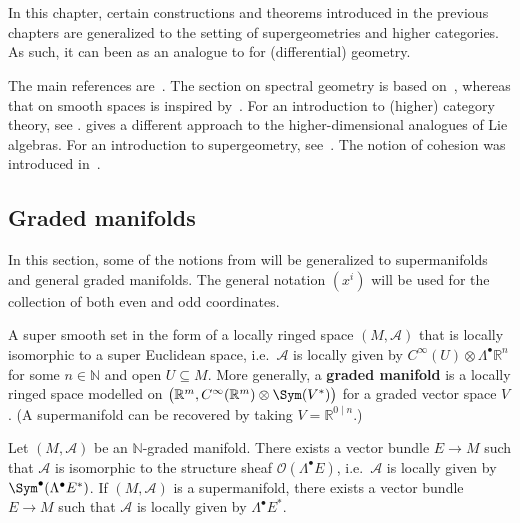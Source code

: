 \chapter{}\label{chapter:hdg}

    In this chapter, certain constructions and theorems introduced in the previous chapters are generalized to the setting of supergeometries and higher categories. As such, it can been as an analogue to  for (differential) geometry.

    The main references are~\citet{schreiber_loop_2005,baez_higher_2005}. The section on spectral geometry is based on~\citet{sanders_commutative_2012}, whereas that on smooth spaces is inspired by~\citet{baez_convenient_2011}. For an introduction to (higher) category theory, see .  gives a different approach to the higher-dimensional analogues of Lie algebras. For an introduction to supergeometry, see~\citet{cattaneo_introduction_2011}. The notion of cohesion was introduced in~\citet{lawvere_cohesive_1994}.


    \minitoc

\section{Graded manifolds}

    In this section, some of the notions from  will be generalized to supermanifolds and general graded manifolds. The general notation $(x^i)$ will be used for the collection of both even and odd coordinates.

    \begin{example}[Supermanifold]\label{hdg:supermanifold}
        A super smooth set in the form of a locally ringed space $(M,\mathcal{A})$ that is locally isomorphic to a super Euclidean space, i.e.~$\mathcal{A}$ is locally given by $C^\infty(U)\otimes\Lambda^\bullet\mathbb{R}^n$ for some $n\in\mathbb{N}$ and open $U\subseteq M$. More generally, a \textbf{graded manifold} is a locally ringed space modelled on $\bigl(\mathbb{R}^m,C^\infty(\mathbb{R}^m)\otimes\Sym(V^*)\bigr)$ for a graded vector space $V$. (A supermanifold can be recovered by taking $V=\mathbb{R}^{0\mid n}$.)
    \end{example}

    \begin{theorem}[Batchelor]
        Let $(M,\mathcal{A})$ be an $\mathbb{N}$-graded manifold. There exists a vector bundle $E\rightarrow M$ such that $\mathcal{A}$ is isomorphic to the structure sheaf $\mathcal{O}(\Lambda^\bullet E)$, i.e.~$\mathcal{A}$ is locally given by $\Sym^\bullet(\Lambda^\bullet E^*)$. If $(M,\mathcal{A})$ is a supermanifold, there exists a vector bundle $E\rightarrow M$ such that $\mathcal{A}$ is locally given by $\Lambda^\bullet E^*$.
    \end{theorem}

